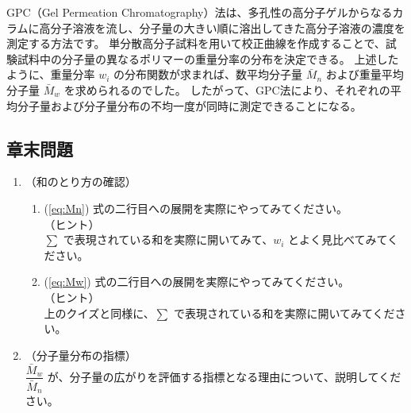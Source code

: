\documentclass[a4paper,11pt]{ltjsarticle}
\begin{document}
GPC（Gel Permeation Chromatography）法は、多孔性の高分子ゲルからなるカラムに高分子溶液を流し、分子量の大きい順に溶出してきた高分子溶液の濃度を測定する方法です。
単分散高分子試料を用いて校正曲線を作成することで、試験試料中の分子量の異なるポリマーの重量分率の分布を決定できる。
上述したように、重量分率 $w_i$ の分布関数が求まれば、数平均分子量 $\bar{M}_n$ および重量平均分子量 $\bar{M}_w$ を求められるのでした。
したがって、GPC法により、それぞれの平均分子量および分子量分布の不均一度が同時に測定できることになる。



\subsection{章末問題}

	\begin{enumerate}
	\item
	（和のとり方の確認）\\
		\vspace{-5mm}
		\begin{enumerate}
		\item
		\label{it:4-1}
		(\ref{eq:Mn}) 式の二行目への展開を実際にやってみてください。\\
		（ヒント）\\
		$\sum$ で表現されている和を実際に開いてみて、$w_i$ とよく見比べてみてください。

		\item
		\label{it:4-2}
		(\ref{eq:Mw}) 式の二行目への展開を実際にやってみてください。\\
		（ヒント）\\
		上のクイズと同様に、$\sum$ で表現されている和を実際に開いてみてください。
		\end{enumerate}
	\item
	（分子量分布の指標）\\
	\label{it:4-3}
	$\dfrac{\bar{M}_w}{\bar{M}_n}$ が、分子量の広がりを評価する指標となる理由について、説明してください。

	\end{enumerate}
\end{document}
